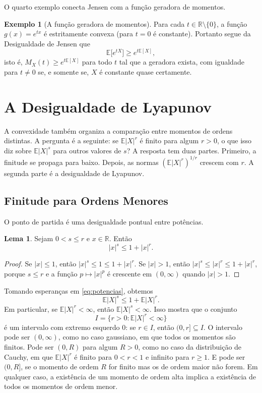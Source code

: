 \documentclass[12pt,portuguese]{article}
\theoremstyle{definition}
\newtheorem{example}[example]{Exemplo}
\newtheorem{lemma}[lemma]{Lema}
\theoremstyle{plainexercise}
\theoremstyle{starredexercise}
\theoremstyle{definition}
\begin{document}
O quarto exemplo conecta Jensen com a função geradora de momentos.

\begin{example}[A função geradora de momentos]\label{ex:jensen-fgm}
Para cada $t\in\mathbb{R}\setminus\{0\}$, a função $g(x)=e^{tx}$ é
estritamente convexa (para $t=0$ é constante). Portanto segue da Desigualdade de Jensen que
\[
\mathbb{E}\bigl[e^{tX}\bigr]\geqslant e^{t\mathbb{E}[X]},
\]
isto é, $M_X(t)\geqslant e^{t\mathbb{E}[X]}$ para todo $t$ tal que a geradora
exista, com igualdade para $t\neq0$ se, e somente se, $X$ é constante quase
certamente.
\end{example}

\section{A Desigualdade de Lyapunov}\label{sec:lyapunov}

A convexidade também organiza a comparação entre momentos de ordens distintas.
A pergunta é a seguinte: se $\mathbb{E}|X|^r$ é finito para algum $r>0$, o que
isso diz sobre $\mathbb{E}|X|^s$ para outros valores de $s$? A resposta tem duas
partes. Primeiro, a finitude se propaga para baixo. Depois, as normas
$(\mathbb{E}|X|^r)^{1/r}$ crescem com $r$. A segunda parte é a desigualdade de
Lyapunov.

\subsection{Finitude para Ordens Menores}\label{subsec:lyapunov-finitude}

O ponto de partida é uma desigualdade pontual entre potências.

\begin{lemma}\label{lem:potencias}
Sejam $0<s\leqslant r$ e $x\in\mathbb{R}$. Então
\begin{equation}\label{eq:potencias}
|x|^s\leqslant1+|x|^r.
\end{equation}
\end{lemma}

\begin{proof}
Se $|x|\leqslant1$, então $|x|^s\leqslant1\leqslant1+|x|^r$. Se $|x|>1$,
então $|x|^s\leqslant|x|^r\leqslant1+|x|^r$, porque $s\leqslant r$ e a função
$p\longmapsto |x|^p$ é crescente em $(0,\infty)$ quando $|x|>1$.
\end{proof}

Tomando esperanças em \eqref{eq:potencias}, obtemos
\[
\mathbb{E}|X|^s\leqslant1+\mathbb{E}|X|^r.
\]
Em particular, se $\mathbb{E}|X|^r<\infty$, então $\mathbb{E}|X|^s<\infty$.
Isso mostra que o conjunto
\[
I=\bigl\{r>0:\mathbb{E}|X|^r<\infty\bigr\}
\]
é um intervalo com extremo esquerdo $0$: se $r\in I$, então $(0,r]\subseteq I$.
O intervalo pode ser $(0,\infty)$, como no caso gaussiano, em que todos os
momentos são finitos. Pode ser $(0,R)$ para algum $R>0$, como no caso da
distribuição de Cauchy, em que $\mathbb{E}|X|^r$ é finito para $0<r<1$ e
infinito para $r\geqslant1$. E pode ser $(0,R]$, se o momento de ordem $R$ for
finito mas os de ordem maior não forem. Em qualquer caso, a existência de um
momento de ordem alta implica a existência de todos os momentos de ordem menor.
\end{document}
